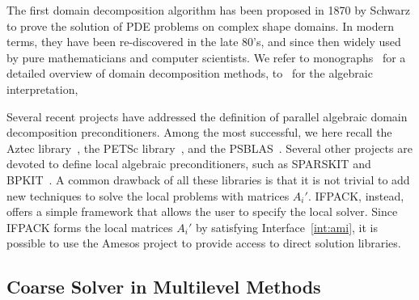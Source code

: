 \documentclass[acmtocl]{acmtrans2m}
\begin{document}
The first domain decomposition algorithm has been proposed in 1870 by Schwarz
to prove the solution of PDE problems on complex shape domains. In modern
terms, they have been re-discovered in the late 80's, and since then widely
used by pure mathematicians and computer scientists. We refer to
monographs~\cite{QV2,smith96parallel} for a detailed
overview of domain decomposition methods, to~\cite{saad96iterative} for the
algebraic interpretation,
  
\smallskip

Several recent projects have addressed the definition of parallel algebraic
domain decomposition preconditioners. Among the most successful, we here
recall the Aztec library~\cite{Aztec}, the PETSc library~\cite{petsc-guide},
and the PSBLAS~\cite{psblas}. Several other projects are devoted to define
local algebraic preconditioners, such as SPARSKIT and BPKIT~\cite{bpkit}. 
A common drawback of all these libraries is that it is not trivial to add new
techniques to solve the local problems with matrices $A_i'$. IFPACK, instead,
offers a simple framework that allows the user to specify the local solver.
Since IFPACK forms the local matrices $A_i'$ by satisfying
Interface~\ref{int:ami}, it is possible to use the Amesos project to provide
access to direct solution libraries.

\subsection{Coarse Solver in Multilevel Methods}
\label{sec:ml}
\end{document}
